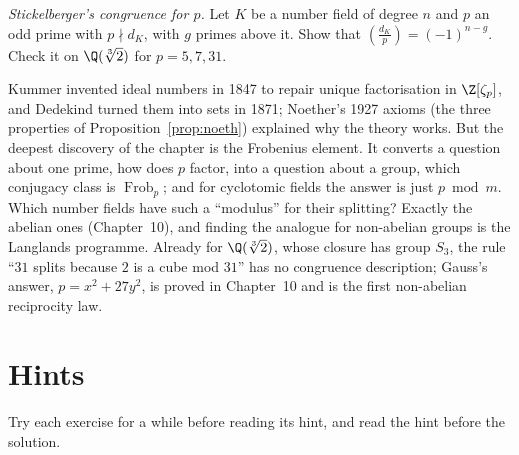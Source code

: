 \begin{exercise}[$\star\star\star$]\label{ex:stickelbergerp}
\emph{Stickelberger's congruence for $p$.} Let $K$ be a number field of degree $n$ and $p$ an odd prime with $p\nmid d_K$,
with $g$ primes above it. Show that $\left(\frac{d_K}p\right)=(-1)^{n-g}$. Check it on $\Q(\sqrt[3]2)$ for $p=5,7,31$.
\end{exercise}

\begin{beauty}
Kummer invented ideal numbers in 1847 to repair unique factorisation in $\Z[\zeta_p]$, and Dedekind turned them into sets
in 1871; Noether's 1927 axioms (the three properties of Proposition~\ref{prop:noeth}) explained why the theory works. But the
deepest discovery of the chapter is the Frobenius element. It converts a question about one prime, how does $p$
factor, into a question about a group, which conjugacy class is $\operatorname{Frob}_p$; and for cyclotomic fields the
answer is just $p\bmod m$. Which number fields have such a ``modulus'' for their splitting? Exactly the abelian ones
(Chapter~10), and finding the analogue for non-abelian groups is the Langlands programme. Already for $\Q(\sqrt[3]2)$,
whose closure has group $S_3$, the rule ``$31$ splits because $2$ is a cube mod $31$'' has no congruence description;
Gauss's answer, $p=x^2+27y^2$, is proved in Chapter~10 and is the first non-abelian reciprocity law.
\end{beauty}

\section{Hints}

Try each exercise for a while before reading its hint, and read the hint before the solution.

